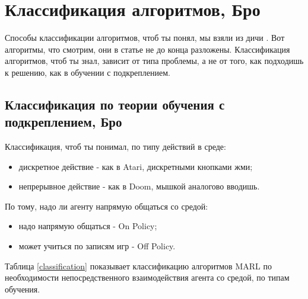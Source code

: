 
\chapter{Классификация алгоритмов, Бро}

Способы классификации алгоритмов, чтоб ты понял, мы взяли из дичи \cite{DBLP:journals/corr/abs-2011-00583}. Вот алгоритмы, что смотрим, они в статье не до конца разложены. Классификация алгоритмов, чтоб ты знал, зависит от типа проблемы, а не от того, как подходишь к решению, как в обучении с подкреплением.

\section{Классификация по теории обучения с подкреплением, Бро}

Классификация, чтоб ты понимал, по типу действий в среде:
\begin{itemize}[label=---]
\item дискретное действие - как в Atari, дискретными кнопками жми;
\item непрерывное действие - как в Doom, мышкой аналогово вводишь.
\end{itemize}

По тому, надо ли агенту напрямую общаться со средой:
\begin{itemize}[label=---]
\item надо напрямую общаться - On Policy;
\item может учиться по записям игр - Off Policy.
\end{itemize}


Таблица \ref{classification} показывает классификацию алгоритмов MARL по необходимости непосредственного взаимодействия агента со средой, по типам обучения.

